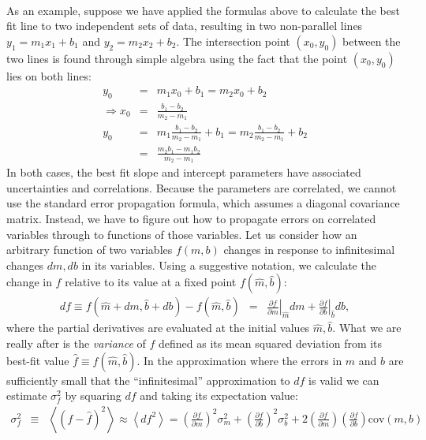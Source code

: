 \documentclass{article}
\begin{document}
\paragraph{}
As an example, suppose we have applied the formulas above to calculate the best fit line to two independent sets of data, resulting in two non-parallel lines $y_1 = m_1 x_1 + b_1$ and $y_2 = m_2 x_2 + b_2$. The intersection point $(x_0, y_0)$ between the two lines is found through simple algebra using the fact that the point $(x_0, y_0)$ lies on both lines:
\begin{eqnarray}
  y_0 &=& m_1 x_0 + b_1 = m_2 x_0 + b_2 \\
  \Rightarrow x_0 &=& \frac{b_1 - b_2}{m_2 - m_1} \\
  y_0 &=& m_1 \frac{b_1 - b_2}{m_2 - m_1} + b_1 = m_2 \frac{b_1 - b_2}{m_2 - m_1} + b_2 \\
  &=& \frac{m_2 b_1 - m_1 b_2}{m_2 - m_1} 
\end{eqnarray}
In both cases, the best fit slope and intercept parameters have associated uncertainties and correlations. Because the parameters are correlated, we cannot use the standard error propagation formula, which assumes a diagonal covariance matrix. Instead, we have to figure out how to propagate errors on correlated variables through to functions of those variables. Let us consider how an arbitrary function of two variables $f(m,b)$ changes in response to infinitesimal changes $dm, db$ in its variables. Using a suggestive notation, we calculate the change in $f$ relative to its value at a fixed point $f(\hat{m}, \hat{b})$:
\begin{eqnarray}
  df \equiv f(\hat{m} + dm, \hat{b} + db) - f(\hat{m}, \hat{b}) &=&  \left.\frac{\partial f}{\partial m}\right|_{\hat{m}} dm + \left. \frac{\partial f}{\partial b}\right|_{\hat{b}} db,
\end{eqnarray}
 where the partial derivatives are evaluated at the initial values $\hat{m}, \hat{b}$. What we are really after is the \emph{variance} of $f$ defined as its mean squared deviation from its best-fit value $\hat{f} \equiv f(\hat{m}, \hat{b})$. In the approximation where the errors in $m$ and $b$ are sufficiently small that the ``infinitesimal'' approximation to $df$ is valid we can estimate $\sigma_f^2$ by squaring $df$ and taking its expectation value:
\begin{eqnarray}
  \sigma_f^2 &\equiv& \left<(f - \hat{f})^2 \right> \approx \left< df^2 \right> = \left(\frac{\partial f}{\partial m}\right)^2 \sigma_m^2  + \left(\frac{\partial f}{\partial b}\right)^2 \sigma_b^2 + 2\left(\frac{\partial f}{\partial m}\right)\left(\frac{\partial f}{\partial b}\right) \mbox{cov}(m, b) 
\end{eqnarray}
\end{document}

